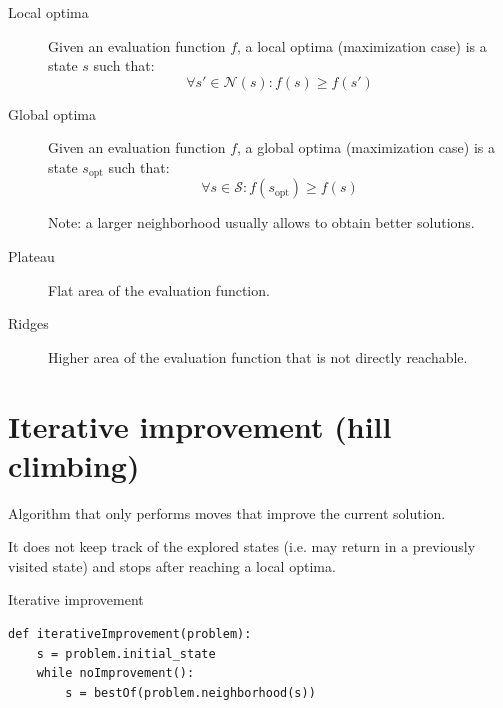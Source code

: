 \begin{description}
        
    \item[Local optima]
    Given an evaluation function $f$,
    a local optima (maximization case) is a state $s$ such that:
    \[ \forall s' \in \mathcal{N}(s): f(s) \geq f(s') \]

    \item[Global optima]
        Given an evaluation function $f$,
        a global optima (maximization case) is a state $s_\text{opt}$ such that:
        \[ \forall s \in \mathcal{S}: f(s_\text{opt}) \geq f(s) \]

        Note: a larger neighborhood usually allows to obtain better solutions.

    \item[Plateau]
        Flat area of the evaluation function.

    \item[Ridges]
        Higher area of the evaluation function that is not directly reachable.
\end{description}



\section{Iterative improvement (hill climbing)}
Algorithm that only performs moves that improve the current solution.

It does not keep track of the explored states (i.e. may return in a previously visited state) and 
stops after reaching a local optima.

\begin{algorithm}
\caption{Iterative improvement}
\begin{lstlisting}
def iterativeImprovement(problem):
    s = problem.initial_state
    while noImprovement():
        s = bestOf(problem.neighborhood(s))
\end{lstlisting}
\end{algorithm}




